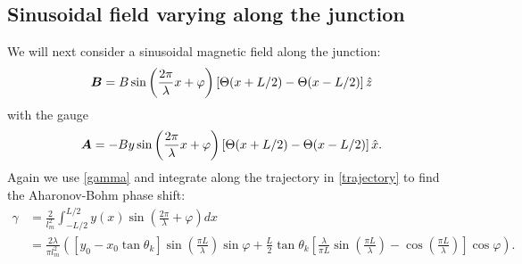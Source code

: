 \subsection{Sinusoidal field varying along the junction}
\label{sec:alongJunction}
We will next consider a sinusoidal magnetic field along the junction:
\begin{equation}
    \boldsymbol{B} = B\sin\left(\frac{2\pi}{\lambda}x + \varphi\right)\left[\Theta(x+L/2) - \Theta(x-L/2) \right]\hat{z}
\label{B4}
\end{equation}
with the gauge
\begin{equation}
    \boldsymbol{A} = -By\sin\left(\frac{2\pi}{\lambda}x + \varphi\right)\left[\Theta(x+L/2) - \Theta(x-L/2) \right]\hat{x}.
\label{A4}
\end{equation}
Again we use \eqref{gamma} and integrate along the trajectory in \eqref{trajectory} to find the Aharonov-Bohm phase shift:
\begin{equation}
\begin{split}
    \gamma &= \frac{2}{l_m^2}\int_{-L/2}^{L/2}y(x)\sin\left(\frac{2\pi}{\lambda} +\varphi \right) dx \\
    &= \frac{2\lambda}{\pi l_m^2}\left(\left[y_0 - x_0\tan\theta_k\right]\sin\left(\frac{\pi L}{\lambda}\right)\sin\varphi+\frac{L}{2}\tan\theta_k\left[\frac{\lambda}{\pi L}\sin\left(\frac{\pi L}{\lambda}\right)-\cos\left(\frac{\pi L}{\lambda}\right)\right]\cos\varphi\right).
\end{split}
\label{gamma2}
\end{equation}

